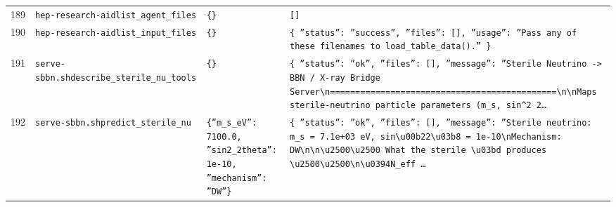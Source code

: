\documentclass[11pt,a4paper]{article}
\begin{document}
\begin{longtable}{@{}p{}p{}p{}p{}@{}}
189 & \texttt{hep-research-aid}\newline\texttt{list\_\allowbreak{}agent\_\allowbreak{}files} & \texttt{\{\}\allowbreak{}} & \texttt{[]\allowbreak{}} \\
190 & \texttt{hep-research-aid}\newline\texttt{list\_\allowbreak{}input\_\allowbreak{}files} & \texttt{\{\}\allowbreak{}} & \texttt{\{   ''status'':\allowbreak{} ''success'',\allowbreak{}   ''files'':\allowbreak{} []\allowbreak{},\allowbreak{}   ''usage'':\allowbreak{} ''Pass any of these filenames to load\_\allowbreak{}table\_\allowbreak{}data()\allowbreak{}.'' \}\allowbreak{}} \\
191 & \texttt{serve-sbbn.sh}\newline\texttt{describe\_\allowbreak{}sterile\_\allowbreak{}nu\_\allowbreak{}tools} & \texttt{\{\}\allowbreak{}} & \texttt{\{   ''status'':\allowbreak{} ''ok'',\allowbreak{}   ''files'':\allowbreak{} []\allowbreak{},\allowbreak{}   ''message'':\allowbreak{} ''Sterile Neutrino -\textgreater{}\allowbreak{} BBN /\allowbreak{} X-ray Bridge Server\textbackslash{}\allowbreak{}n=\allowbreak{}=\allowbreak{}=\allowbreak{}=\allowbreak{}=\allowbreak{}=\allowbreak{}=\allowbreak{}=\allowbreak{}=\allowbreak{}=\allowbreak{}=\allowbreak{}=\allowbreak{}=\allowbreak{}=\allowbreak{}=\allowbreak{}=\allowbreak{}=\allowbreak{}=\allowbreak{}=\allowbreak{}=\allowbreak{}=\allowbreak{}=\allowbreak{}=\allowbreak{}=\allowbreak{}=\allowbreak{}=\allowbreak{}=\allowbreak{}=\allowbreak{}=\allowbreak{}=\allowbreak{}=\allowbreak{}=\allowbreak{}=\allowbreak{}=\allowbreak{}=\allowbreak{}=\allowbreak{}=\allowbreak{}=\allowbreak{}=\allowbreak{}=\allowbreak{}=\allowbreak{}=\allowbreak{}=\allowbreak{}=\allowbreak{}=\allowbreak{}\textbackslash{}\allowbreak{}n\textbackslash{}\allowbreak{}nMaps sterile-neutrino particle parameters (m\_\allowbreak{}s,\allowbreak{} sin\textasciicircum{}\allowbreak{}2 2\ldots{}\allowbreak{}} \\
192 & \texttt{serve-sbbn.sh}\newline\texttt{predict\_\allowbreak{}sterile\_\allowbreak{}nu} & \texttt{\{''m\_\allowbreak{}s\_\allowbreak{}eV'':\allowbreak{} 7100.0,\allowbreak{} ''sin2\_\allowbreak{}2theta'':\allowbreak{} 1e-10,\allowbreak{} ''mechanism'':\allowbreak{} ''DW''\}\allowbreak{}} & \texttt{\{   ''status'':\allowbreak{} ''ok'',\allowbreak{}   ''files'':\allowbreak{} []\allowbreak{},\allowbreak{}   ''message'':\allowbreak{} ''Sterile neutrino:\allowbreak{} m\_\allowbreak{}s =\allowbreak{} 7.1e+03 eV,\allowbreak{} sin\textbackslash{}\allowbreak{}u00b22\textbackslash{}\allowbreak{}u03b8 =\allowbreak{} 1e-10\textbackslash{}\allowbreak{}nMechanism:\allowbreak{} DW\textbackslash{}\allowbreak{}n\textbackslash{}\allowbreak{}n\textbackslash{}\allowbreak{}u2500\textbackslash{}\allowbreak{}u2500 What the sterile \textbackslash{}\allowbreak{}u03bd produces \textbackslash{}\allowbreak{}u2500\textbackslash{}\allowbreak{}u2500\textbackslash{}\allowbreak{}n\textbackslash{}\allowbreak{}u0394N\_\allowbreak{}eff \ldots{}\allowbreak{}} \\

\end{longtable}
\end{document}
